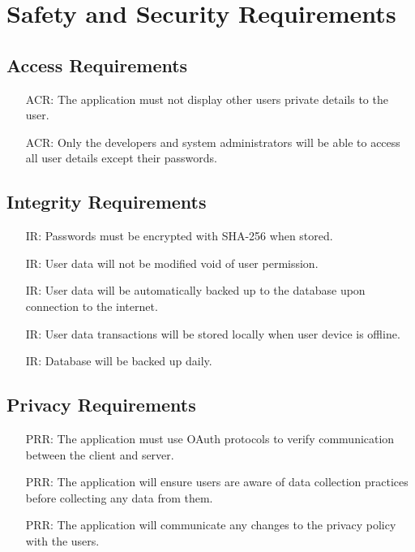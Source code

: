 \documentclass{article}
\newcounter{ACRnum}
\newcounter{IRnum}
\newcounter{PRRnum}
\begin{document}
	\section{Safety and Security Requirements}
	
	
	\subsection{Access Requirements}
	\noindent 
	\begin{itemize}
		\item[ACR\refstepcounter{ACRnum}\theACRnum:]
		The application must not display other users private details to the user.
		\item[ACR\refstepcounter{ACRnum}\theACRnum:]
		Only the developers and system administrators will be able to access all user details except their passwords.
	\end{itemize}
	\subsection{Integrity Requirements}
	\noindent 
	\begin{itemize}
		\item[IR\refstepcounter{IRnum}\theIRnum:]
		Passwords must be encrypted with SHA-256 when stored.
		\item[IR\refstepcounter{IRnum}\theIRnum:]
		User data will not be modified void of user permission.
		\item[IR\refstepcounter{IRnum}\theIRnum:]
		User data will be automatically backed up to the database upon connection to the internet.
		\item[IR\refstepcounter{IRnum}\theIRnum:]
		User data transactions will be stored locally when user device is offline.
		\item[IR\refstepcounter{IRnum}\theIRnum:]
		Database will be backed up daily.
	\end{itemize}
	\subsection{Privacy Requirements}
	\noindent 
	\begin{itemize}
		\item[PRR\refstepcounter{PRRnum}\thePRRnum:]
		The application must use OAuth protocols to verify communication between the client and server.
		\item[PRR\refstepcounter{PRRnum}\thePRRnum:]
		The application will ensure users are aware of data collection practices before collecting any data from them.
		\item[PRR\refstepcounter{PRRnum}\thePRRnum:]
		The application will communicate any changes to the privacy policy with the users.	
	\end{itemize}
\end{document}
